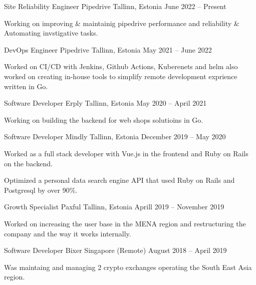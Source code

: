 \documentclass[]{awesome-cv}
\begin{document}
\vspace{-7mm}
\begin{cventries}
        \cventry
       {Site Reliability Engineer}
        {Pipedrive}
        {Tallinn, Estonia}
        {June 2022 – Present}
        {\begin{cvitems}
                \item {Working on improving \& maintainig pipedrive performance and reliability \& Automating invstigative tasks.}
                \end{cvitems}}
        \cventry
       {DevOps Engineer}
        {Pipedrive}
        {Tallinn, Estonia}
        {May 2021 – June 2022}
        {\begin{cvitems}
                \item {Worked on CI/CD with Jenkins, Github Actions, Kuberenets and helm also worked on creating in-house tools to simplify remote development exprience written in Go.}
                \end{cvitems}}
	\cventry
	{Software Developer}
	{Erply}
	{Tallinn, Estonia}
	{May 2020 – April 2021}
	{\begin{cvitems}
		\item {Working on building the backend for web shops solutioins in Go.}
		\end{cvitems}}
	\cventry
	{Software Developer}
	{Mindly}
	{Tallinn, Estonia}
	{December 2019 – May 2020}
	{\begin{cvitems}
		\item {Worked as a full stack developer with Vue.js in the frontend and Ruby on Rails on the backend.}
		\item {Optimized a personal data search engine API that used Ruby on Rails and Postgresql by over 90\%.}
		\end{cvitems}}
	\cventry
	{Growth Specialist}
	{Paxful}
	{Tallinn, Estonia}
	{Aprill 2019 – November 2019}
	{\begin{cvitems}
		\item {Worked on increasing the user base in the MENA region and restructuring the company and the way it works internally.}
		\end{cvitems}}
	\cventry
	{Software Developer}
	{Bixer}
	{Singapore (Remote)}
	{August 2018 – April 2019}
	{\begin{cvitems}
		\item {Was maintaing and managing 2 crypto exchanges operating the South East Asia region.}

\end{cvitems}}
\end{cventries}
\end{document}
